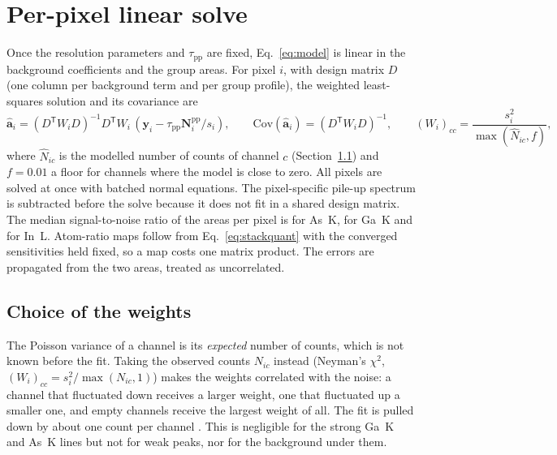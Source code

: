 \documentclass[11pt,a4paper]{article}
\begin{document}
\section{Per-pixel linear solve}\label{sec:maps}
Once the resolution parameters and $\tau_\mathrm{pp}$ are fixed, Eq.~\eqref{eq:model} is linear in the
background coefficients and the group areas. For pixel $i$, with design matrix $D$ (one column per
background term and per group profile), the weighted least-squares solution and its covariance are
\begin{equation}
\hat{\mathbf a}_i = (D^\mathsf{T}W_iD)^{-1}D^\mathsf{T}W_i\,(\mathbf y_i - \tau_\mathrm{pp}\mathbf N^\mathrm{pp}_i/s_i),
\qquad \mathrm{Cov}(\hat{\mathbf a}_i)=(D^\mathsf{T}W_iD)^{-1},
\qquad (W_i)_{cc} = \frac{s_i^2}{\max(\hat N_{ic},f)} ,
\label{eq:linear}
\end{equation}
where $\hat N_{ic}$ is the modelled number of counts of channel $c$ (Section~\ref{sec:weights}) and
$f=0.01$ a floor for channels where the model is close to zero.
All pixels are solved at once with batched normal equations. The pixel-specific pile-up spectrum is
subtracted before the solve because it does not fit in a shared design matrix. The median
signal-to-noise ratio of the areas per pixel is \rSnrAs{} for As~K, \rSnrGa{} for Ga~K and \rSnrIn{}
for In~L. Atom-ratio maps follow from Eq.~\eqref{eq:stackquant} with the converged sensitivities
held fixed, so a map costs one matrix product. The errors are propagated from the two areas, treated
as uncorrelated.

\subsection{Choice of the weights}\label{sec:weights}
The Poisson variance of a channel is its \emph{expected} number of counts, which is not known before
the fit. Taking the observed counts $N_{ic}$ instead (Neyman's $\chi^2$, $(W_i)_{cc}=s_i^2/\max(N_{ic},1)$)
makes the weights correlated with the noise: a channel that fluctuated down receives a larger weight,
one that fluctuated up a smaller one, and empty channels receive the largest weight of all. The fit is
pulled down by about one count per channel \citep{Baker1984,Mighell1999}. This is negligible for the
strong Ga~K and As~K lines but not for weak peaks, nor for the background under them.
\end{document}
